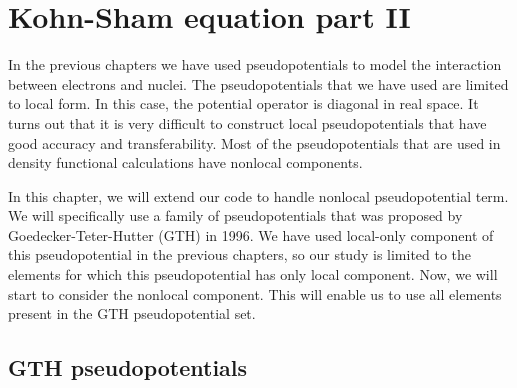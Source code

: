 \chapter{Kohn-Sham equation part II}
\label{chap:ks_part_2}

In the previous chapters we have used pseudopotentials to model the interaction
between electrons and nuclei. The pseudopotentials that we have used
are limited to local form. In this case, the potential operator is diagonal
in real space. It turns out that it is very difficult to construct local pseudopotentials
that have good accuracy and transferability. Most of the pseudopotentials that
are used in density functional calculations have nonlocal components.

In this chapter, we will extend our code to handle
nonlocal pseudopotential term.
We will specifically use a family of pseudopotentials that was
proposed by Goedecker-Teter-Hutter (GTH) \cite{Goedecker1996} in 1996.
We have used local-only component of this pseudopotential in the previous chapters, so
our study is limited to the elements for which this pseudopotential has only local
component. Now, we will start to consider the nonlocal component.
This will enable us to use all elements present in the GTH pseudopotential set.

\section{GTH pseudopotentials}

